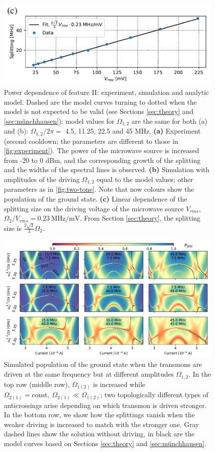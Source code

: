 \documentclass[%
 pra,
 amsmath,amssymb,
 reprint,%
]{revtex4-1}
\begin{document}
\begin{figure}
	\includegraphics[width=.7\linewidth]{powerscan_1d}
	\caption{Power dependence of feature II: 
	experiment, simulation and analytic model. Dashed are the model curves turning to dotted when the 
	model is not expected to be valid (see 
	Sections \ref{sec:theory} and 
	\ref{sec:münchhausen}); model values for 
	$\Omega_{1,2}$ are the same for both (a) and 
	(b): $\Omega_{1,2}/2\pi=$ 4.5, 11.25, 22.5 
	and 45 MHz. \textbf{(a)} Experiment (second 
	cooldown; the parameters are different to 
	those in \autoref{fig:experiment}). The power 
	of the microwave source is increased from -20 
	to 0 dBm, and the corresponding growth of the 
	splitting and the widths of the spectral 
	lines is observed. \textbf{(b)} Simulation 
	with amplitudes of the driving $\Omega_{1,2}$ 
	equal to the model values; other parameters 
	as in \autoref{fig:two-tone}. Note that now 
	colours show the population of the ground 
	state. \textbf{(c)} Linear dependence of the 
	splitting size on the driving voltage of the 
	microwave source $V_{rms}$, ${\Omega_2}/{V_{rms}} = 0.23\ 
	{\text{MHz}}/{\text{mV}}$. From Section 
	\ref{sec:theory}, the splitting size is 
	$\frac{2\sqrt{3}}{3} \Omega_2$.}
	\label{fig:zoom}
\end{figure}


\begin{figure}
	\centering
	\includegraphics[width=\linewidth]{topological_splittings}
	\caption{Simulated population of the ground 
	state when the transmons are driven at the 
	same frequency but at different amplitudes 
	$\Omega_{1,2}$. In the top row (middle row), 
	$\Omega_{1(2)}$ is increased while 
	$\Omega_{2(1)} = \text{const},\ \Omega_{2(1)} \ll 
	\Omega_{1(2)}$; two topologically different 
	types of anticrossings arise depending on 
	which transmon is driven stronger. In the 
	bottom row, we show how the splittings vanish 
	when the weaker driving is increased to match 
	with the stronger one. Gray dashed lines show 
	the solution without driving, in black are 
	the model curves based on Sections 
	\ref{sec:theory} and \ref{sec:münchhausen}.}
	\label{fig:difdrive}
\end{figure}
\end{document}
